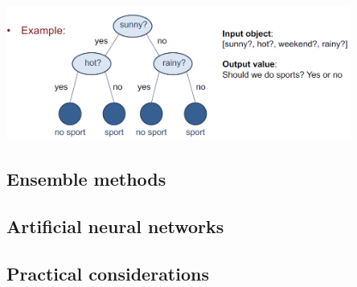 \begin{center}\includegraphics[width=0.85\textwidth]{img/machine/MachineDecisionTrees.png}\end{center}



\subsection{Ensemble methods}

\subsection{Artificial neural networks}

\subsection{Practical considerations}